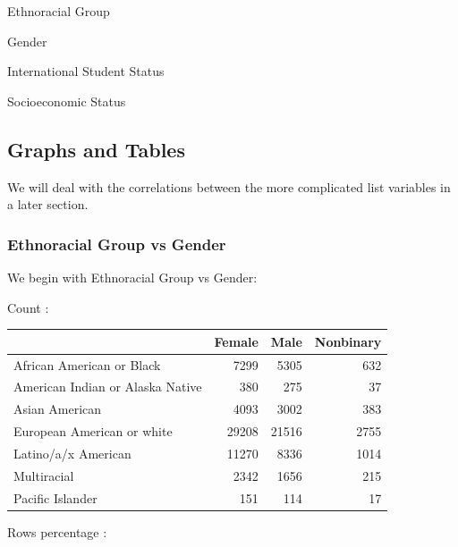 \documentclass[
  twocolumn]{article}
\newenvironment{Shaded}{\begin{snugshade}}{\end{snugshade}}
\newcommand{\FunctionTok}[1]{\textcolor[rgb]{0.13,0.29,0.53}{\textbf{#1}}}
\newcommand{\NormalTok}[1]{#1}
\newcommand{\SpecialCharTok}[1]{\textcolor[rgb]{0.81,0.36,0.00}{\textbf{#1}}}
\begin{document}
Ethnoracial Group

Gender

International Student Status

Socioeconomic Status

\subsection{Graphs and Tables}\label{graphs-and-tables}

We will deal with the correlations between the more complicated list
variables in a later section.

\subsubsection{Ethnoracial Group vs
Gender}\label{ethnoracial-group-vs-gender}

We begin with Ethnoracial Group vs Gender:

\begin{Shaded}
\end{Shaded}

Count :

\begin{longtable}[]{@{}lrrr@{}}
\toprule\noalign{}
& Female & Male & Nonbinary \\
\midrule\noalign{}
\endhead
\bottomrule\noalign{}
\endlastfoot
African American or Black & 7299 & 5305 & 632 \\
American Indian or Alaska Native & 380 & 275 & 37 \\
Asian American & 4093 & 3002 & 383 \\
European American or white & 29208 & 21516 & 2755 \\
Latino/a/x American & 11270 & 8336 & 1014 \\
Multiracial & 2342 & 1656 & 215 \\
Pacific Islander & 151 & 114 & 17 \\
\end{longtable}

Rows percentage :
\end{document}
